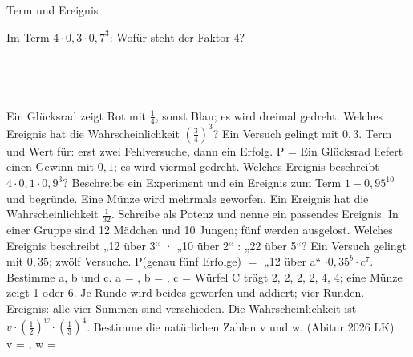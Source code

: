 \setcounter{aufgabe}{26}

\begin{aufgabe}{Term und Ereignis}
\begin{teile}
\teil Im Term $4 \cdot 0{,}3 \cdot 0{,}7^3$: Wofür steht der Faktor 4?\\ \\ \\ \\ \\ 
\teil Ein Glücksrad zeigt Rot mit $\frac{1}{4}$, sonst Blau; es wird dreimal gedreht. Welches Ereignis hat die Wahrscheinlichkeit $\left(\frac{3}{4}\right)^3$?
\teil Ein Versuch gelingt mit $0{,}3$. Term und Wert für: erst zwei Fehlversuche, dann ein Erfolg. P = \leerfeld
\teil Ein Glücksrad liefert einen Gewinn mit $0{,}1$; es wird viermal gedreht. Welches Ereignis beschreibt $4 \cdot 0{,}1 \cdot 0{,}9^3$?
\teil Beschreibe ein Experiment und ein Ereignis zum Term $1 - 0{,}95^{10}$ und begründe.
\teil Eine Münze wird mehrmals geworfen. Ein Ereignis hat die Wahrscheinlichkeit $\frac{1}{32}$. Schreibe als Potenz und nenne ein passendes Ereignis.
\teil In einer Gruppe sind 12 Mädchen und 10 Jungen; fünf werden ausgelost. Welches Ereignis beschreibt „12 über 3“ · „10 über 2“ : „22 über 5“?
\teil Ein Versuch gelingt mit $0{,}35$; zwölf Versuche. P(genau fünf Erfolge) $=$ „12 über a“ $\cdot 0{,}35^b \cdot c^7$. Bestimme a, b und c. a = \leerfeld, b = \leerfeld, c = \leerfeld
\teil Würfel C trägt 2, 2, 2, 2, 4, 4; eine Münze zeigt 1 oder 6. Je Runde wird beides geworfen und addiert; vier Runden. Ereignis: alle vier Summen sind verschieden. Die Wahrscheinlichkeit ist $v \cdot \left(\frac{1}{2}\right)^w \cdot \left(\frac{1}{3}\right)^4$. Bestimme die natürlichen Zahlen v und w. \hfill (Abitur 2026 LK) \\ v = \leerfeld, w = \leerfeld
\end{teile}
\end{aufgabe}

